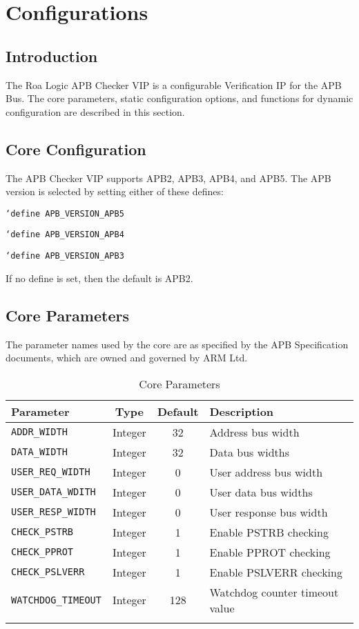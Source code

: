 \chapter{Configurations}\label{configurations}

\section{Introduction}\label{introduction-1}

The Roa Logic APB Checker VIP is a configurable Verification IP for the APB Bus.
The core parameters, static configuration options, and functions for dynamic configuration are described in this section.

\section{Core Configuration}\label{core-configuration}
The APB Checker VIP supports APB2, APB3, APB4, and APB5. The APB version is selected by setting either of these defines:

\texttt{`define APB\_VERSION\_APB5}

\texttt{`define APB\_VERSION\_APB4}

\texttt{`define APB\_VERSION\_APB3}

If no define is set, then the default is APB2.

\section{Core Parameters}\label{core-parameters}

The parameter names used by the core are as specified by the APB Specification documents, which are owned and governed by ARM Ltd.

\begin{longtable}[]{@{}lccl@{}}
\toprule
Parameter & Type & Default & Description\tabularnewline
\midrule
\endhead
\texttt{ADDR\_WIDTH} & Integer & 32 & Address bus width\tabularnewline
\texttt{DATA\_WIDTH} & Integer & 32 & Data bus widths\tabularnewline
\texttt{USER\_REQ\_WIDTH} & Integer & 0 & User address bus width\tabularnewline
\texttt{USER\_DATA\_WDITH} & Integer & 0 & User data bus widths\tabularnewline
\texttt{USER\_RESP\_WIDTH} & Integer & 0 & User response bus width\tabularnewline
\texttt{CHECK\_PSTRB} & Integer & 1 & Enable PSTRB checking\tabularnewline
\texttt{CHECK\_PPROT} & Integer & 1 & Enable PPROT checking\tabularnewline
\texttt{CHECK\_PSLVERR} & Integer & 1 & Enable PSLVERR checking\tabularnewline
\texttt{WATCHDOG\_TIMEOUT} & Integer & 128 & Watchdog counter timeout value\tabularnewline
\bottomrule
\caption{Core Parameters}
\end{longtable}

